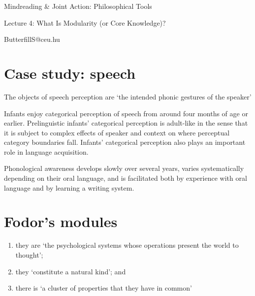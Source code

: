 \documentclass[11pt]{extarticle}
\date{}
\begin{document}
\begin{multicols}{3}

\setlength\footnotesep{1em}









\begin{center}
{\Large
Mindreading \& Joint Action: Philosophical Tools}

Lecture 4: What Is Modularity (or Core Knowledge)?


ButterfillS@ceu.hu
\end{center}


\section{Case study: speech}

The objects of speech perception are ‘the intended  phonic gestures of the speaker’\citep{Liberman:1985bn} %

Infants enjoy categorical perception of speech from around four months of age or earlier.\citep{Eimas:1971cp} 
Prelinguistic infants’ categorical perception is adult-like in the sense that it is subject to complex effects of speaker and context on where perceptual category boundaries fall.\citep{Kuhl:1987la,Kuhl:2004nv} %
Infants’ categorical perception also plays an important role in language acquisition.\citep{Jusczyk:1995it,Saffran:1996aj}

Phonological awareness develops slowly over several years, varies systematically depending on their oral language, and is facilitated both by experience with oral language and by learning a writing system.\citep{Anthony:2004yp}


\section{Fodor's modules}

\begin{enumerate}
\item	they are ‘the psychological systems whose operations present the world to thought’;
\item	they ‘constitute a natural kind’; and
\item	there is ‘a cluster of properties that they have in common’\citep{Fodor:1983dg} %
\end{enumerate}


\end{multicols}
\end{document}
